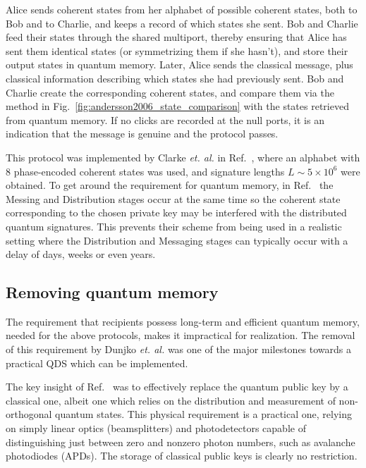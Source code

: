 Alice sends coherent states from her alphabet of possible coherent states, both to Bob and to Charlie, and keeps a record of which states she sent. Bob and Charlie feed their states through the shared multiport, thereby ensuring that Alice has sent them identical states (or symmetrizing them if she hasn't), and store their output states in quantum memory. Later, Alice sends the classical message, plus classical information describing which states she had previously sent. Bob and Charlie create the corresponding coherent states, and compare them via the method in Fig.~\ref{fig:andersson2006_state_comparison} with the states retrieved from quantum memory. If no clicks are recorded at the null ports, it is an indication that the message is genuine and the protocol passes.

This protocol was implemented by Clarke \emph{et. al.} in Ref.~\cite{Clarke2012}, where an alphabet with $8$ phase-encoded coherent states was used, and signature lengths $L \sim 5 \times 10^6$ were obtained. To get around the requirement for quantum memory, in Ref.~\cite{Clarke2012} the Messing and Distribution stages occur at the same time so the coherent state corresponding to the chosen private key may be interfered with the distributed quantum signatures. This prevents their scheme from being used in a realistic setting where the Distribution and Messaging stages can typically occur with a delay of days, weeks or even years.


\subsection{Removing quantum memory}
The requirement that recipients possess long-term and efficient quantum memory, needed for the above protocols, makes it impractical for realization. The removal of this requirement by Dunjko \emph{et. al.} \cite{Dunjko2014} was one of the major milestones towards a practical QDS which can be implemented. 

The key insight of Ref.~\cite{Dunjko2014} was to effectively replace the quantum public key by a classical one, albeit one which relies on the distribution and measurement of non-orthogonal quantum states. This physical requirement is a practical one, relying on simply linear optics (beamsplitters) and photodetectors capable of distinguishing just between zero and nonzero photon numbers, such as avalanche photodiodes (APDs). The storage of classical public keys is clearly no restriction. 

